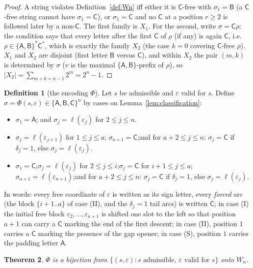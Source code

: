 \documentclass[11pt]{article}
\newtheorem{theorem}{Theorem}[section]
\theoremstyle{definition}
\newtheorem{definition}[theorem]{Definition}
\theoremstyle{remark}
\newcommand{\sA}{\mathsf{A}}
\newcommand{\sB}{\mathsf{B}}
\newcommand{\sC}{\mathsf{C}}
\newcommand{\Wn}{W_n}
\begin{document}
\begin{proof}
A string violates Definition~\ref{def:Wn} iff either it is $\sC$-free with
$\sigma_1=\sB$ (a $\sC$-free string cannot have $\sigma_1=\sC$), or
$\sigma_1=\sC$ and no $\sC$ at a position $r\ge2$ is followed later by a
non-$\sC$. The first family is $X_1$. For the second, write
$\sigma=\sC\rho$: the condition says that every letter after the first
$\sC$ of $\rho$ (if any) is again $\sC$, i.e.\
$\rho\in\{\sA,\sB\}^*\sC^*$, which is exactly the family $X_2$ (the case
$k=0$ covering $\sC$-free $\rho$). $X_1$ and $X_2$ are disjoint (first
letter $\sB$ versus $\sC$), and within $X_2$ the pair $(m,k)$ is determined
by $\sigma$ ($v$ is the maximal $\{\sA,\sB\}$-prefix of $\rho$), so
$|X_2|=\sum_{m+k=n-1}2^m=2^n-1$.
\end{proof}

\begin{definition}[the encoding $\Phi$]\label{def:phi}
Let $s$ be admissible and $\varepsilon$ valid for $s$. Define
$\sigma=\Phi(s,\varepsilon)\in\{\sA,\sB,\sC\}^n$ by cases on
Lemma~\ref{lem:classification}:
\begin{itemize}
\item[(S)] $\sigma_1=\sA$; and $\sigma_j=\ell(\varepsilon_j)$ for
 $2\le j\le n$.
\item[(I)] $\sigma_j=\ell(\varepsilon_{j+1})$ for $1\le j\le a$;\quad
 $\sigma_{a+1}=\sC$;\quad and for $a+2\le j\le n$:
 $\sigma_j=\sC$ if $\delta_j=1$, else $\sigma_j=\ell(\varepsilon_j)$.
\item[(II)] $\sigma_1=\sC$;\quad $\sigma_j=\ell(\varepsilon_j)$ for
 $2\le j\le i$;\quad $\sigma_j=\sC$ for $i+1\le j\le a$;\quad
 $\sigma_{a+1}=\ell(\varepsilon_{a+1})$;\quad and for $a+2\le j\le n$:
 $\sigma_j=\sC$ if $\delta_j=1$, else $\sigma_j=\ell(\varepsilon_j)$.
\end{itemize}
\end{definition}

In words: every free coordinate of $\varepsilon$ is written as its sign
letter, every \emph{forced} arc (the block $\{i+1..a\}$ of case (II), and
the $\delta_j=1$ tail arcs) is written $\sC$; in case (I) the initial free
block $\varepsilon_2,\dots,\varepsilon_{a+1}$ is shifted one slot to the
left so that position $a+1$ can carry a $\sC$ marking the end of the first
descent; in case (II), position $1$ carries a $\sC$ marking the presence of
the gap opener; in case (S), position $1$ carries the padding letter
$\sA$.

\begin{theorem}\label{thm:B}
$\Phi$ is a bijection from
$\{(s,\varepsilon): s \text{ admissible},\ \varepsilon \text{ valid for } s\}$
onto $\Wn$.
\end{theorem}
\end{document}
